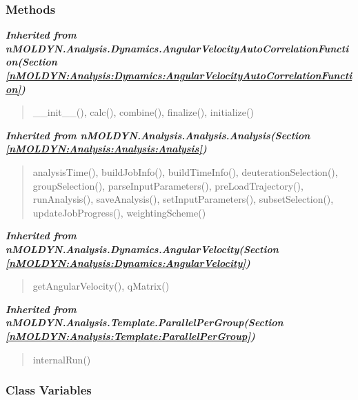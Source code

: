   \subsubsection{Methods}


\large{\textbf{\textit{Inherited from nMOLDYN.Analysis.Dynamics.AngularVelocityAutoCorrelationFunction\textit{(Section \ref{nMOLDYN:Analysis:Dynamics:AngularVelocityAutoCorrelationFunction})}}}}

\begin{quote}
\_\_init\_\_(), calc(), combine(), finalize(), initialize()
\end{quote}

\large{\textbf{\textit{Inherited from nMOLDYN.Analysis.Analysis.Analysis\textit{(Section \ref{nMOLDYN:Analysis:Analysis:Analysis})}}}}

\begin{quote}
analysisTime(), buildJobInfo(), buildTimeInfo(), deuterationSelection(), groupSelection(), parseInputParameters(), preLoadTrajectory(), runAnalysis(), saveAnalysis(), setInputParameters(), subsetSelection(), updateJobProgress(), weightingScheme()
\end{quote}

\large{\textbf{\textit{Inherited from nMOLDYN.Analysis.Dynamics.AngularVelocity\textit{(Section \ref{nMOLDYN:Analysis:Dynamics:AngularVelocity})}}}}

\begin{quote}
getAngularVelocity(), qMatrix()
\end{quote}

\large{\textbf{\textit{Inherited from nMOLDYN.Analysis.Template.ParallelPerGroup\textit{(Section \ref{nMOLDYN:Analysis:Template:ParallelPerGroup})}}}}

\begin{quote}
internalRun()
\end{quote}


  \subsubsection{Class Variables}

